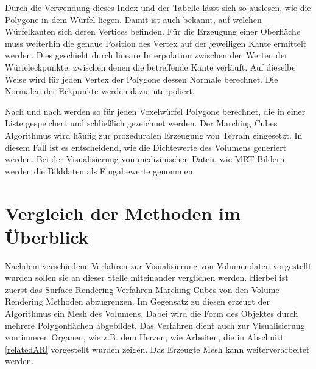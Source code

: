 Durch die Verwendung dieses Index und der Tabelle lässt sich so auslesen, wie die Polygone in dem Würfel liegen. Damit ist auch bekannt, auf welchen Würfelkanten sich deren Vertices befinden. Für die Erzeugung einer Oberfläche muss weiterhin die genaue Position des Vertex auf der jeweiligen Kante ermittelt werden. Dies geschieht durch lineare Interpolation zwischen den Werten der Würfeleckpunkte, zwischen denen die betreffende Kante verläuft. 
Auf dieselbe Weise wird für jeden Vertex der Polygone dessen Normale berechnet. Die Normalen der Eckpunkte werden dazu interpoliert.

Nach und nach werden so für jeden Voxelwürfel Polygone berechnet, die in einer Liste gespeichert und schließlich gezeichnet werden.
Der Marching Cubes Algorithmus wird häufig zur prozeduralen Erzeugung von Terrain eingesetzt. In diesem Fall ist es entscheidend, wie die Dichtewerte des Volumens generiert werden. Bei der Visualisierung von medizinischen Daten, wie MRT-Bildern werden die Bilddaten als Eingabewerte genommen.




\section{Vergleich der Methoden im Überblick}											 %

Nachdem verschiedene Verfahren zur Visualisierung von Volumendaten vorgestellt wurden sollen sie an dieser Stelle miteinander verglichen werden. 
Hierbei ist zuerst das Surface Rendering Verfahren Marching Cubes von den Volume Rendering Methoden abzugrenzen. Im Gegensatz zu diesen erzeugt der Algorithmus ein Mesh des Volumens. Dabei wird die Form des Objektes durch mehrere Polygonflächen abgebildet. Das Verfahren dient auch zur Visualisierung von inneren Organen, wie z.B. dem Herzen, wie Arbeiten, die in Abschnitt \ref{relatedAR} vorgestellt wurden zeigen. Das Erzeugte Mesh kann weiterverarbeitet werden. 

